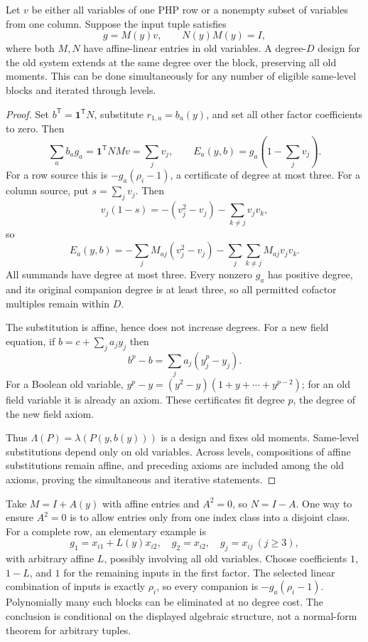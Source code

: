 \begin{lemma}\label{lem:affineinverse}
Let $v$ be either all variables of one PHP row or a nonempty subset of variables from one column. Suppose the input tuple satisfies
\[
 g=M(y)v,\qquad N(y)M(y)=I,
\]
where both $M,N$ have affine-linear entries in old variables. A degree-$D$ design for the old system extends at the same degree over the block, preserving all old moments. This can be done simultaneously for any number of eligible same-level blocks and iterated through levels.
\end{lemma}
\begin{proof}
Set $b^{\mathsf T}=\mathbf1^{\mathsf T}N$, substitute $r_{1,a}=b_a(y)$, and set all other factor coefficients to zero. Then
\[
 \sum_ab_ag_a=\mathbf1^{\mathsf T}NMv=\sum_jv_j,
 \qquad E_a(y,b)=g_a\left(1-\sum_jv_j\right).
\]
For a row source this is $-g_a(\rho_i-1)$, a certificate of degree at most three. For a column source, put $s=\sum_jv_j$. Then
\[
 v_j(1-s)=-(v_j^2-v_j)-\sum_{k\ne j}v_jv_k,
\]
so
\[
 E_a(y,b)=-\sum_jM_{aj}(v_j^2-v_j)
          -\sum_j\sum_{k\ne j}M_{aj}v_jv_k.
\]
All summands have degree at most three. Every nonzero $g_a$ has positive degree, and its original companion degree is at least three, so all permitted cofactor multiples remain within $D$.

The substitution is affine, hence does not increase degrees. For a new field equation, if $b=c+\sum_j a_jy_j$ then
\[
 b^p-b=\sum_j a_j(y_j^p-y_j).
\]
For a Boolean old variable,
$y^p-y=(y^2-y)(1+y+\cdots+y^{p-2})$; for an old field variable it is already an axiom. These certificates fit degree $p$, the degree of the new field axiom.

Thus $\Lambda(P)=\lambda(P(y,b(y)))$ is a design and fixes old moments. Same-level substitutions depend only on old variables. Across levels, compositions of affine substitutions remain affine, and preceding axioms are included among the old axioms, proving the simultaneous and iterative statements.
\end{proof}

\begin{example}
Take $M=I+A(y)$ with affine entries and $A^2=0$, so $N=I-A$. One way to ensure $A^2=0$ is to allow entries only from one index class into a disjoint class. For a complete row, an elementary example is
\[
 g_1=x_{i1}+L(y)x_{i2},\quad g_2=x_{i2},\quad g_j=x_{ij}\ (j\ge3),
\]
with arbitrary affine $L$, possibly involving all old variables. Choose coefficients $1$, $1-L$, and $1$ for the remaining inputs in the first factor. The selected linear combination of inputs is exactly $\rho_i$, so every companion is $-g_a(\rho_i-1)$. Polynomially many such blocks can be eliminated at no degree cost. The conclusion is conditional on the displayed algebraic structure, not a normal-form theorem for arbitrary tuples.
\end{example}

